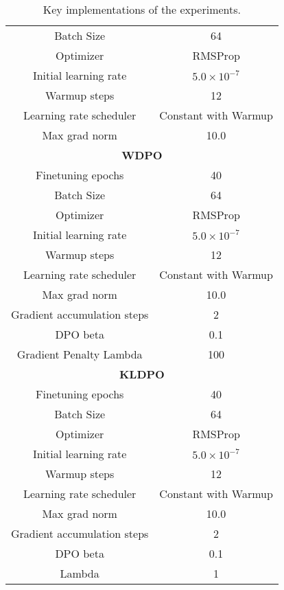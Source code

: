 \begin{table}[!ht]
{\begin{tabular}{cc}
        Batch Size & 64 \\
        Optimizer & RMSProp \\
        Initial learning rate & $5.0 \times 10^{-7}$ \\
        Warmup steps & 12 \\
        Learning rate scheduler & Constant with Warmup \\
        Max grad norm & 10.0 \\
        \midrule
        \multicolumn{2}{c}{\textbf{WDPO}} \\ \midrule
        Finetuning epochs & 40 \\
        Batch Size & 64 \\
        Optimizer & RMSProp \\
        Initial learning rate & $5.0 \times 10^{-7}$ \\
        Warmup steps & 12 \\
        Learning rate scheduler & Constant with Warmup \\
        Max grad norm & 10.0 \\
        Gradient accumulation steps & 2 \\
        DPO beta & 0.1 \\
        Gradient Penalty Lambda & 100 \\
        \midrule
        \multicolumn{2}{c}{\textbf{KLDPO}} \\ \midrule
        Finetuning epochs & 40 \\
        Batch Size & 64 \\
        Optimizer & RMSProp \\
        Initial learning rate & $5.0 \times 10^{-7}$ \\
        Warmup steps & 12 \\
        Learning rate scheduler & Constant with Warmup \\
        Max grad norm & 10.0 \\
        Gradient accumulation steps & 2 \\
        DPO beta & 0.1 \\
        Lambda & 1 \\ 
        \bottomrule
    \end{tabular}
    }
    \caption{Key implementations of the experiments.}
    \label{tab:key-implementations}
\end{table}